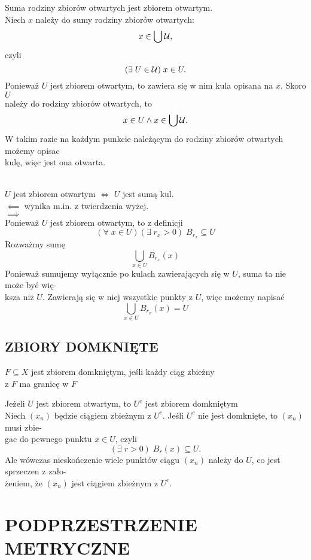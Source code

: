 \documentclass{article}
\begin{document}
\dowod
Suma rodziny zbiorów otwartych jest zbiorem otwartym.\medskip\\
Niech $x$ należy do sumy rodziny zbiorów otwartych:
$$x\in\bigcup \mathcal{U},$$
czyli
$$(\exists\;U\in\mathcal{U})\;x\in U.$$
Ponieważ $U$ jest zbiorem otwartym, to zawiera się w nim kula opisana na $x$. Skoro $U$ \\należy do rodziny zbiorów otwartych, to 
$$x\in U\land x\in\bigcup\mathcal{U}.$$
W takim razie na każdym punkcie należącym do rodziny zbiorów otwartych możemy opisac \\kulę, więc jest ona otwarta.
\kondow

\bigskip\\
$U$ jest zbiorem otwartym $\iff$ $U$ jest sumą kul.\medskip\\

\dowod
$\impliedby$ wynika m.in. z twierdzenia wyżej.\medskip\\
$\implies$\smallskip\\
Ponieważ $U$ jest zbiorem otwartym, to z definicji
$$(\forall\;x\in U)(\exists\;r_x>0) \;B_{r_x}\subseteq U$$
Rozważmy sumę
$$\bigcup\limits_{x\in U}B_{r_x}(x)$$
Ponieważ sumujemy wyłącznie po kulach zawierających się w $U$, suma ta nie może być wię-\\ksza niż $U$. Zawierają się w niej wszystkie punkty z $U$, więc możemy napisać
$$\bigcup\limits_{x\in U}B_{r_x}(x)=U$$
\kondow

\subsection{ZBIORY DOMKNIĘTE}
\begin{center}\large
    $F\subseteq X$ jest {\color{def}zbiorem domkniętym}, jeśli każdy ciąg zbieżny \\z $F$ ma granicę w $F$
\end{center}\bigskip
Jeżeli $U$ jest zbiorem otwartym, to $U^c$ jest zbiorem domkniętym\medskip\\
\dowod
Niech $(x_n)$ będzie ciągiem zbieżnym z $U^c$. Jeśli $U^c$ nie jest domknięte, to $(x_n)$ musi zbie-\\gac do pewnego punktu $x\in U$, czyli
$$(\exists\;r>0)\;B_r(x)\subseteq U.$$
Ale wówczas nieskończenie wiele punktów ciągu $(x_n)$ należy do $U$, co jest sprzeczen z zało-\\żeniem, że $(x_n)$ jest ciągiem zbieżnym z $U^c$.
\kondow

\section{PODPRZESTRZENIE METRYCZNE}
\end{document}

